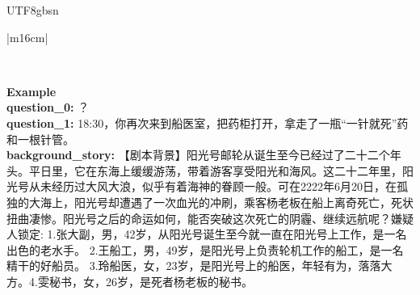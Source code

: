 \documentclass[11pt]{article}
\begin{document}
{\begin{CJK}{UTF8}{gbsn}
\begin{table}[ht!]
\begin{tabular}{|m{16cm}|}
\begin{minipage}[t]{\linewidth}
\begin{verbatim}
\end{verbatim}
\end{minipage} \\
\hline
{}  \textbf{Example}  \\
 \textbf{  question\_0:} ？\\
  \textbf{  question\_1:} \small18:30，你再次来到船医室，把药柜打开，拿走了一瓶“一针就死”药和一根针管。\\
  \textbf{  background\_story:} \small【剧本背景】阳光号邮轮从诞生至今已经过了二十二个年头。平日里，它在东海上缓缓游荡，带着游客享受阳光和海风。这二十二年里，阳光号从未经历过大风大浪，似乎有着海神的眷顾一般。可在2222年6月20日，在孤独的大海上，阳光号却遭遇了一次血光的冲刷，乘客杨老板在船上离奇死亡，死状扭曲凄惨。阳光号之后的命运如何，能否突破这次死亡的阴霾、继续远航呢？嫌疑人锁定: 1.张大副，男，42岁，从阳光号诞生至今就一直在阳光号上工作，是一名出色的老水手。 2.王船工，男，49岁，是阳光号上负责轮机工作的船工，是一名精干的好船员。 3.玲船医，女，23岁，是阳光号上的船医，年轻有为，落落大方。4.雯秘书，女，26岁，是死者杨老板的秘书。\\


\end{tabular}
\end{table}
\end{CJK}}
\end{document}
